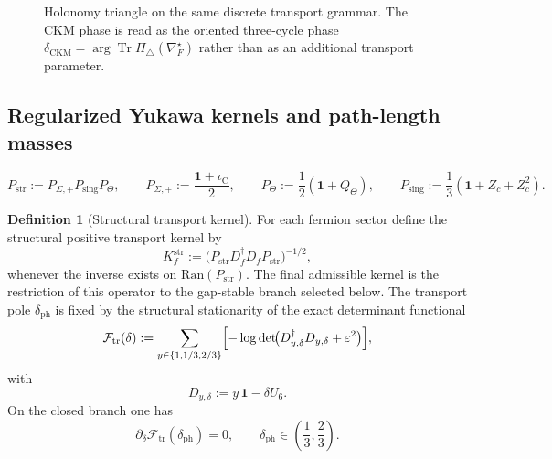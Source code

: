 \documentclass[11pt,a4paper]{article}
\theoremstyle{definition}
\newtheorem{definition}[theorem]{Definition}
\theoremstyle{remark}
\DeclareMathOperator{\tr}{Tr}
\newcommand{\Seam}{\Sigma}
\newcommand{\iC}{\iota_{\mathrm C}}
\begin{document}
\begin{figure}[t]
\centering
\scriptsize
{}
\caption{Holonomy triangle on the same discrete transport grammar. The CKM phase is read as the
oriented three-cycle phase $\delta_{\mathrm{CKM}}=\arg\tr\Pi_\triangle(\nabla_F^\star)$ rather
than as an additional transport parameter.}
\label{fig:holonomy-triangle}
\end{figure}

\subsection{Regularized Yukawa kernels and path-length masses}

\[
P_{\mathrm{str}}:=P_{\Seam,+}P_{\mathrm{sing}}P_\Theta,
\qquad
P_{\Seam,+}:=\frac{\mathbf 1+\iC}{2},
\qquad
P_\Theta:=\frac12(\mathbf 1+Q_\Theta),
\qquad
P_{\mathrm{sing}}:=\frac13(\mathbf 1+Z_c+Z_c^2).
\]

\begin{definition}[Structural transport kernel]
\label{def:structural-transport-kernel}
For each fermion sector define the structural positive transport kernel by
\[
K_f^{\mathrm{str}}:=\bigl(P_{\mathrm{str}} D_f^\dagger D_f P_{\mathrm{str}}\bigr)^{-1/2},
\]
whenever the inverse exists on $\mathrm{Ran}(P_{\mathrm{str}})$. The final admissible kernel is
the restriction of this operator to the gap-stable branch selected below. The transport pole
$\delta_{\mathrm{ph}}$ is fixed by the structural stationarity of the exact determinant functional
\[
\mathcal F_{\mathrm{tr}}(\delta)
:=
\sum_{y\in\{1,1/3,2/3\}}
\Bigl[-\log\det\!\bigl(D_{y,\delta}^\dagger D_{y,\delta}+\varepsilon^2\bigr)\Bigr],
\]
with
\[
D_{y,\delta}:=y\,\mathbf 1-\delta U_6.
\]
On the closed branch one has
\begin{equation}
\label{eq:transport-bridge-offset}
\partial_\delta \mathcal F_{\mathrm{tr}}(\delta_{\mathrm{ph}})=0,
\qquad
\delta_{\mathrm{ph}}\in\left(\frac13,\frac23\right).
\end{equation}
\end{definition}
\end{document}
